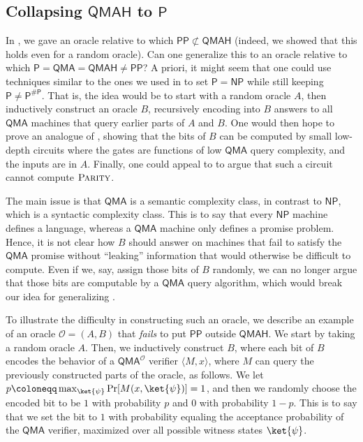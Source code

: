 \documentclass[10pt,a4paper]{article}
\newcommand{\PARITY}{\normalfont\textsc{Parity}}
\begin{document}
\subsection{Collapsing \texorpdfstring{$\mathsf{QMAH}$}{QMAH} to \texorpdfstring{$\mathsf{P}$}{P}}
In , we gave an oracle relative to which $\mathsf{PP} \not\subset \mathsf{QMAH}$ (indeed, we showed that this holds even for a random oracle). Can one generalize this to an oracle relative to which $\mathsf{P}=\mathsf{QMA}=\mathsf{QMAH}\neq\mathsf{PP}$? A priori, it might seem that one could use techniques similar to the ones we used in  to set $\mathsf{P} = \mathsf{NP}$ while still keeping $\mathsf{P} \neq \mathsf{P^{\# P}}$. That is, the idea would be to start with a random oracle $A$, then inductively construct an oracle $B$, recursively encoding into $B$ answers to all $\mathsf{QMA}$ machines that query earlier parts of $A$ and $B$. One would then hope to prove an analogue of , showing that the bits of $B$ can be computed by small low-depth circuits where the gates are functions of low $\mathsf{QMA}$ query complexity, and the inputs are in $A$. Finally, one could appeal to  to argue that such a circuit cannot compute $\PARITY$.

The main issue is that $\mathsf{QMA}$ is a semantic complexity class, in contrast to $\mathsf{NP}$, which is a syntactic complexity class. This is to say that every $\mathsf{NP}$ machine defines a language, whereas a $\mathsf{QMA}$ machine only defines a promise problem. Hence, it is not clear how $B$ should answer on machines that fail to satisfy the $\mathsf{QMA}$ promise without ``leaking'' information that would otherwise be difficult to compute. Even if we, say, assign those bits of $B$ randomly, we can no longer argue that those bits are computable by a $\mathsf{QMA}$ query algorithm, which would break our idea for generalizing .

To illustrate the difficulty in constructing such an oracle, we describe an example of an oracle $\mathcal{O} = (A, B)$ that \textit{fails} to put $\mathsf{PP}$ outside $\mathsf{QMAH}$. We start by taking a random oracle $A$. Then, we inductively construct $B$, where each bit of $B$ encodes the behavior of a $\mathsf{QMA}^\mathcal{O}$ verifier $\langle M, x \rangle$, where $M$ can query the previously constructed parts of the oracle, as follows. We let $p \coloneqq \max_{\ket{\psi}} \Pr[M(x, \ket{\psi})] = 1$, and then we randomly choose the encoded bit to be $1$ with probability $p$ and $0$ with probability $1-p$. This is to say that we set the bit to $1$ with probability equaling the acceptance probability of the $\mathsf{QMA}$ verifier, maximized over all possible witness states $\ket{\psi}$.
\end{document}
